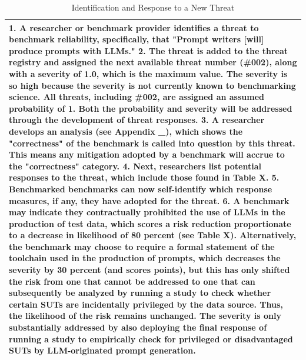 \documentclass{article}
\begin{document}
\begin{table}[h!]
  \caption{Identification and Response to a New Threat}
  \label{tab:identification-response}
  \centering
  \begin{tabular}{p{12cm}}
    \toprule
      1. A researcher or benchmark provider identifies a threat to benchmark reliability, specifically, that "Prompt writers [will] produce prompts with LLMs."
      2. The threat is added to the threat registry and assigned the next available threat number (\#002), along with a severity of 1.0, which is the maximum value. The severity is so high because the severity is not currently known to benchmarking science. All threats, including \#002, are assigned an assumed probability of 1. Both the probability and severity will be addressed through the development of threat responses.
      3. A researcher develops an analysis (see Appendix \_), which shows the "correctness" of the benchmark is called into question by this threat. This means any mitigation adopted by a benchmark will accrue to the "correctness" category. 
      4. Next, researchers list potential responses to the threat, which include those found in Table X.
      5. Benchmarked benchmarks can now self-identify which response measures, if any, they have adopted for the threat.
      6. A benchmark may indicate they contractually prohibited the use of LLMs in the production of test data, which scores a risk reduction proportionate to a decrease in likelihood of 80 percent (see Table X). Alternatively, the benchmark may choose to require a formal statement of the toolchain used in the production of prompts, which decreases the severity by 30 percent (and scores points), but this has only shifted the risk from one that cannot be addressed to one that can subsequently be analyzed by running a study to check whether certain SUTs are incidentally privileged by the data source. Thus, the likelihood of the risk remains unchanged. The severity is only substantially addressed by also deploying the final response of running a study to empirically check for privileged or disadvantaged SUTs by LLM-originated prompt generation. \\
    \bottomrule
  \end{tabular}
\end{table}
\end{document}
